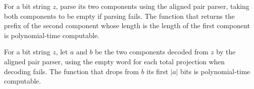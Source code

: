\begin{theorem}
\label{Complexity.polyTimeComputable_takePrefixByLength}
\leanok
{}
For a bit string $z$, parse its two components using the aligned pair parser, taking
both components to be empty if parsing fails. The function that returns the prefix of
the second component whose length is the length of the first component is
polynomial-time computable.
\end{theorem}

\begin{theorem}
\label{Complexity.polyTimeComputable_dropPrefixByLength}
\leanok
{}
For a bit string $z$, let $a$ and $b$ be the two components decoded from $z$ by the
aligned pair parser, using the empty word for each total projection when decoding fails.
The function that drops from $b$ its first $|a|$ bits is polynomial-time computable.
\end{theorem}
